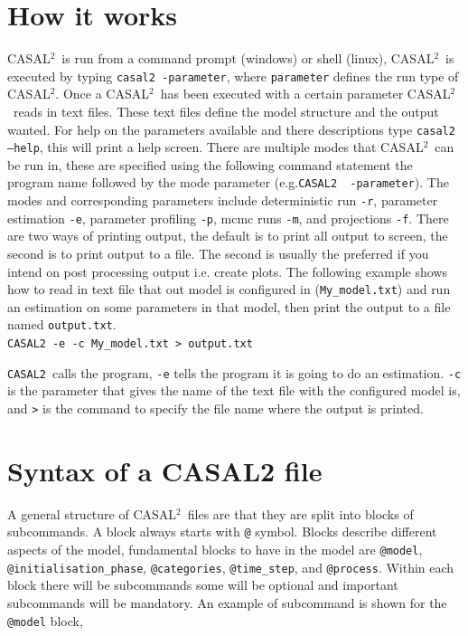 \documentclass[12pt]{article}
\makeatletter
\newcommand{\cas}{\texttt{CASAL2}}
\newcommand{\CAS}{CASAL$^2$}
\newcommand{\command}[1] {\texttt{@#1}}
\makeatother
\begin{document}
\section{How it works}\label{Sec:how}
\CAS\ is run from a command prompt (windows) or shell (linux), \CAS\ is executed by typing \texttt{casal2 -parameter}, where \texttt{parameter} defines the run type of \CAS. Once a \CAS\ has been executed with a certain parameter \CAS\ reads in text files. These text files define the model structure and the output wanted. For help on the parameters available and there descriptions type \texttt{casal2 --help}, this will print a help screen. There are multiple modes that \CAS\ can be run in, these are specified using the following command statement the program name followed by the mode parameter (e.g.\cas\ \texttt{ -parameter}). The modes and corresponding parameters include deterministic run \texttt{-r}, parameter estimation \texttt{-e}, parameter profiling \texttt{-p}, mcmc runs \texttt{-m}, and projections \texttt{-f}. There are two ways of printing output, the default is to print all output to screen, the second is to print output to a file. The second is usually the preferred if you intend on post processing output i.e. create plots. The following example shows how to read in text file that out model is configured in (\texttt{My\_model.txt}) and run an estimation on some parameters in that model, then print the output to a file named \texttt{output.txt}.\\
\cas\ \texttt{-e  -c My\_model.txt > output.txt}

\cas\ calls the program, \texttt{-e} tells the program it is going to do an estimation. \texttt{-c} is the parameter that gives the name of the text file with the configured model is, and \texttt{>} is the command to specify the file name where the output is printed.

\section{Syntax of a CASAL2 file}\label{Sec:stru}
A general structure of \CAS\ files are that they are split into blocks of subcommands. A block always starts with \command{} symbol. Blocks describe different aspects of the model, fundamental blocks to have in the model are \command{model}, \command{initialisation\_phase}, \command{categories}, \command{time\_step}, and \command{process}. Within each block there will be subcommands some will be optional and important subcommands will be mandatory. An example of subcommand is shown for the \command{model} block,
\end{document}
